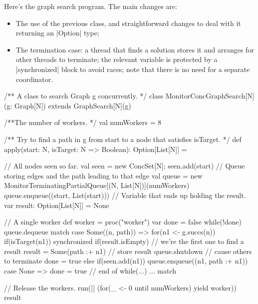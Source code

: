 \begin{answer}
Here's the graph search program.  The main changes are:
\begin{itemize}
\item The use of the previous class, and straightforward changes to deal with
  it returning an |Option| type;

\item The termination case: a thread that finds a solution stores it and
  arranges for other threads to terminate; the relevant variable is protected
  by a |synchronized| block to avoid races; note that there is no need for a
  separate coordinator.
\end{itemize}
\begin{scala}
/** A class to search Graph g concurrently. */
class MonitorConcGraphSearch[N](g: Graph[N]) extends GraphSearch[N](g){
  /**The number of workers. */
  val numWorkers = 8

  /** Try to find a path in g from start to a node that satisfies isTarget. */
  def apply(start: N, isTarget: N => Boolean): Option[List[N]] = {
    // All nodes seen so far.
    val seen = new ConcSet[N]; seen.add(start)
    // Queue storing edges and the path leading to that edge
    val queue = new MonitorTerminatingPartialQueue[(N, List[N])](numWorkers)
    queue.enqueue((start, List(start)))    
    // Variable that ends up holding the result.
    var result: Option[List[N]] = None

    // A single worker
    def worker = proc("worker"){
      var done = false
      while(!done) queue.dequeue match{
        case Some((n, path)) =>
          for(n1 <- g.succs(n)){
            if(isTarget(n1)) synchronized{
              if(result.isEmpty){ // we're the first one to find a result
                result = Some(path :+ n1) // store result
                queue.shutdown // cause others to terminate
                done = true
              }
            }
            else if(seen.add(n1)) queue.enqueue((n1, path :+ n1))
          }
        case None => done = true
      } // end of while(...) ... match
    }

    // Release the workers. 
    run(|| (for(_ <- 0 until numWorkers) yield worker))
    result
  }
}
\end{scala}

\end{answer}
